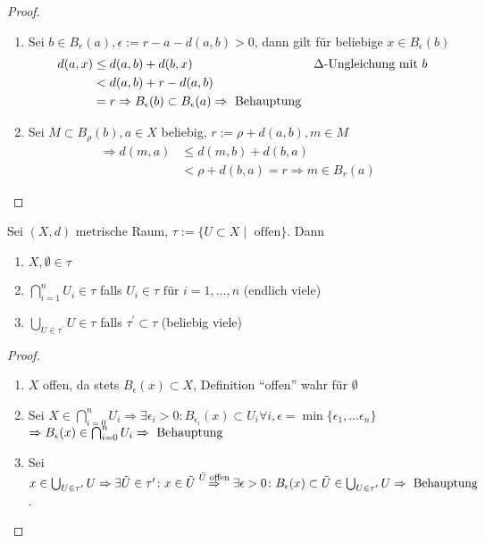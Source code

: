 \begin{proof}
    \begin{enumerate}[label={\arabic*)}]
    \item Sei $b \in B_r(a),\epsilon := r - a-d(a,b)>0$, dann gilt für beliebige $x \in B_{\epsilon}(b)$
    \begin{align*}
        d(a,x) &\leq d(a,b) + d(b,x) & \Delta\text{-Ungleichung mit } b\\
        &<d(a,b)+r-d(a,b)&\\
        &=r \Rightarrow B_{\epsilon}(b) \subset B_{\epsilon}(a) \Rightarrow \text{ Behauptung} &
    \end{align*}
    \item Sei $M\subset B_{\rho}(b),a\in X$ beliebig, $r:=\rho + d(a,b),m\in M$\\
    \begin{align*}
        \Rightarrow d(m,a) &\leq d(m,b)+d(b,a)&\\
        &<\rho + d(b,a) = r \Rightarrow m\in B_{r}(a)
    \end{align*}
    \end{enumerate}\QEDA
\end{proof}

\begin{satz}\label{8_13_satz_open_topo}
    Sei $(X,d)$ metrische Raum, $\tau:=\{ U \subset X \mid \text{ offen} \}$. Dann
    \begin{enumerate}[label={\arabic*)}]
    \item $X,\emptyset\in\tau$
    \item $\bigcap_{i=1}^{n} U_i \in \tau$ falls $U_i\in \tau \text{ für } i = 1, \dots, n$ (endlich viele) 
    \item $\bigcup_{U\in\tau^{\prime}} U \in \tau$ falls $\tau^{\prime} \subset \tau$ (beliebig viele)
    \end{enumerate}
\end{satz}

\begin{proof}
    \begin{enumerate}[label={\arabic*)}]
    \item $X$ offen, da stets $B_{\epsilon}(x) \subset X$, Definition ``offen'' wahr für $\emptyset$
    \item Sei $X \in \bigcap_{i=0}^{n} U_i \Rightarrow \exists \epsilon_i > 0 \colon B_{\epsilon_i}(x) \subset U_i \forall i, \epsilon = \min\{\epsilon_1, \dots \epsilon_n\}$\\
    $\Rightarrow B_{\epsilon}(x) \in \bigcap_{i=0}^{n} U_i \Rightarrow \text{ Behauptung}$
    \item Sei $x \in \bigcup_{U\in\tau^{\prime}} U \Rightarrow \exists \tilde{U}\in \tau^{\prime}\colon x \in \tilde{U} \overset{\tilde{U} \text{ offen}}{\Rightarrow}\exists \epsilon > 0 \colon B_{\epsilon}(x) \subset \tilde{U} \in \bigcup_{U\in\tau^{\prime}} U \Rightarrow \text{ Behauptung}$.
    \end{enumerate}\QEDA
\end{proof}

